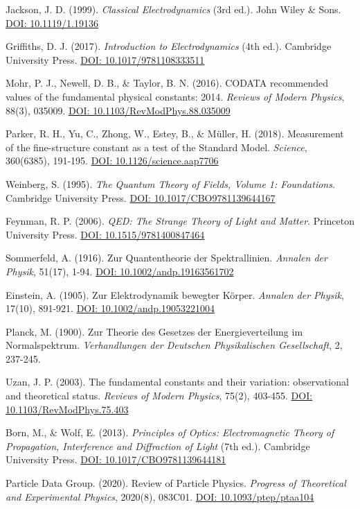 \documentclass[12pt,a4paper]{article}
\begin{document}
	
	\begin{thebibliography}{12}
		 Jackson, J. D. (1999). \textit{Classical Electrodynamics} (3rd ed.). John Wiley \& Sons. \href{https://doi.org/10.1119/1.19136}{DOI: 10.1119/1.19136}
		
		 Griffiths, D. J. (2017). \textit{Introduction to Electrodynamics} (4th ed.). Cambridge University Press. \href{https://doi.org/10.1017/9781108333511}{DOI: 10.1017/9781108333511}
		
		 Mohr, P. J., Newell, D. B., \& Taylor, B. N. (2016). CODATA recommended values of the fundamental physical constants: 2014. \textit{Reviews of Modern Physics}, 88(3), 035009. \href{https://doi.org/10.1103/RevModPhys.88.035009}{DOI: 10.1103/RevModPhys.88.035009}
		
		 Parker, R. H., Yu, C., Zhong, W., Estey, B., \& Müller, H. (2018). Measurement of the fine-structure constant as a test of the Standard Model. \textit{Science}, 360(6385), 191-195. \href{https://doi.org/10.1126/science.aap7706}{DOI: 10.1126/science.aap7706}
		
		 Weinberg, S. (1995). \textit{The Quantum Theory of Fields, Volume 1: Foundations}. Cambridge University Press. \href{https://doi.org/10.1017/CBO9781139644167}{DOI: 10.1017/CBO9781139644167}
		
		 Feynman, R. P. (2006). \textit{QED: The Strange Theory of Light and Matter}. Princeton University Press. \href{https://doi.org/10.1515/9781400847464}{DOI: 10.1515/9781400847464}
		
		 Sommerfeld, A. (1916). Zur Quantentheorie der Spektrallinien. \textit{Annalen der Physik}, 51(17), 1-94. \href{https://doi.org/10.1002/andp.19163561702}{DOI: 10.1002/andp.19163561702}
		
		 Einstein, A. (1905). Zur Elektrodynamik bewegter Körper. \textit{Annalen der Physik}, 17(10), 891-921. \href{https://doi.org/10.1002/andp.19053221004}{DOI: 10.1002/andp.19053221004}
		
		 Planck, M. (1900). Zur Theorie des Gesetzes der Energieverteilung im Normalspektrum. \textit{Verhandlungen der Deutschen Physikalischen Gesellschaft}, 2, 237-245.
		
		 Uzan, J. P. (2003). The fundamental constants and their variation: observational and theoretical status. \textit{Reviews of Modern Physics}, 75(2), 403-455. \href{https://doi.org/10.1103/RevModPhys.75.403}{DOI: 10.1103/RevModPhys.75.403}
		
		 Born, M., \& Wolf, E. (2013). \textit{Principles of Optics: Electromagnetic Theory of Propagation, Interference and Diffraction of Light} (7th ed.). Cambridge University Press. \href{https://doi.org/10.1017/CBO9781139644181}{DOI: 10.1017/CBO9781139644181}
		
		 Particle Data Group. (2020). Review of Particle Physics. \textit{Progress of Theoretical and Experimental Physics}, 2020(8), 083C01. \href{https://doi.org/10.1093/ptep/ptaa104}{DOI: 10.1093/ptep/ptaa104}
	\end{thebibliography}
	
\end{document}
